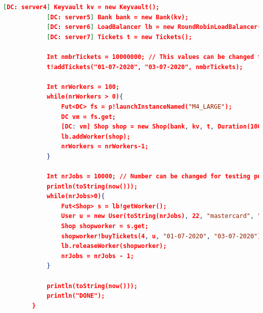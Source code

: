 \documentclass[10pt,a4paper,twocolumn]{article}
\begin{document}
\begin{appendices}
\begin{lstlisting}[language=json]
			[DC: server4] Keyvault kv = new Keyvault();
			[DC: server5] Bank bank = new Bank(kv);
			[DC: server6] LoadBalancer lb = new RoundRobinLoadBalancer();
			[DC: server7] Tickets t = new Tickets();
			
			Int nmbrTickets = 10000000;	// This values can be changed for testing purposes
			t!addTickets("01-07-2020", "03-07-2020", nmbrTickets);
			
			Int nrWorkers = 100;
			while(nrWorkers > 0){
				Fut<DC> fs = p!launchInstanceNamed("M4_LARGE"); 
				DC vm = fs.get;
				[DC: vm] Shop shop = new Shop(bank, kv, t, Duration(1000));
				lb.addWorker(shop); 
				nrWorkers = nrWorkers-1;
			}
			
			Int nrJobs = 10000;	// Number can be changed for testing purposes
			println(toString(now()));
			while(nrJobs>0){
				Fut<Shop> s = lb!getWorker();
				User u = new User(toString(nrJobs), 22, "mastercard", "email", kv);
				Shop shopworker = s.get;
				shopworker!buyTickets(4, u, "01-07-2020", "03-07-2020");
				lb.releaseWorker(shopworker);
				nrJobs = nrJobs - 1;
			} 
			
			println(toString(now())); 
			println("DONE");
		}
	\end{lstlisting}
	
\end{appendices}
\end{document}
